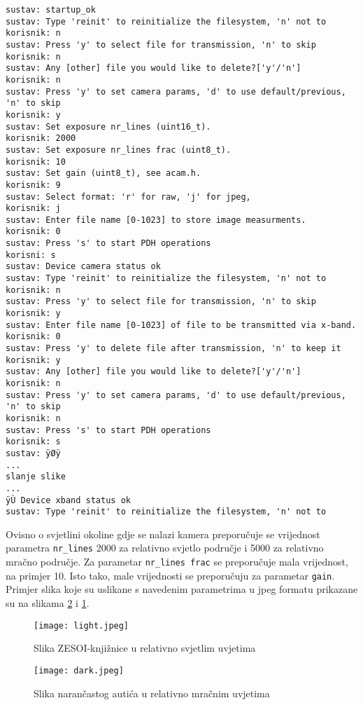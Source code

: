 \begin{lstlisting}[caption=Komunikacija između računala i PDH sustava, label={lst:default_comms}]
sustav: startup_ok
sustav: Type 'reinit' to reinitialize the filesystem, 'n' not to
korisnik: n
sustav: Press 'y' to select file for transmission, 'n' to skip
korisnik: n
sustav: Any [other] file you would like to delete?['y'/'n']
korisnik: n
sustav: Press 'y' to set camera params, 'd' to use default/previous, 'n' to skip
korisnik: y
sustav: Set exposure nr_lines (uint16_t).
korisnik: 2000
sustav: Set exposure nr_lines frac (uint8_t).
korisnik: 10
sustav: Set gain (uint8_t), see acam.h.
korisnik: 9
sustav: Select format: 'r' for raw, 'j' for jpeg,
korisnik: j
sustav: Enter file name [0-1023] to store image measurments.
korisnik: 0
sustav: Press 's' to start PDH operations
korisni: s
sustav: Device camera status ok
sustav: Type 'reinit' to reinitialize the filesystem, 'n' not to
korisnik: n
sustav: Press 'y' to select file for transmission, 'n' to skip
korisnik: y
sustav: Enter file name [0-1023] of file to be transmitted via x-band.
korisnik: 0
sustav: Press 'y' to delete file after transmission, 'n' to keep it
korisnik: y
sustav: Any [other] file you would like to delete?['y'/'n']
korisnik: n
sustav: Press 'y' to set camera params, 'd' to use default/previous, 'n' to skip
korisnik: n
sustav: Press 's' to start PDH operations
korisnik: s
sustav: ÿØÿ
...
slanje slike
...
ÿÙ Device xband status ok
sustav: Type 'reinit' to reinitialize the filesystem, 'n' not to
\end{lstlisting}

Ovisno o svjetlini okoline gdje se nalazi kamera preporučuje se vrijednost parametra \verb|nr_lines| 2000 za relativno svjetlo područje i 5000 za relativno mračno područje. Za parametar \verb|nr_lines frac| se preporučuje mala vrijednost, na primjer 10. Isto tako, male vrijednosti se preporučuju za parametar \verb|gain|. Primjer slika koje su uslikane s navedenim parametrima u jpeg formatu prikazane su na slikama \ref{fig:dark} i \ref{fig:light}.
\begin{figure}[H]
	\centering
	\texttt{[image: light.jpeg]}
	\caption{Slika ZESOI-knjižnice u relativno svjetlim uvjetima}
	\label{fig:light}
\end{figure}
\begin{figure}[H]
	\centering
	\texttt{[image: dark.jpeg]}
	\caption{Slika narančastog autića u relativno mračnim uvjetima}
	\label{fig:dark}
\end{figure}